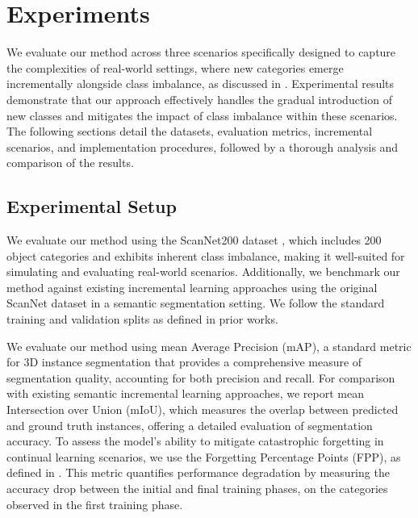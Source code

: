 
\section{Experiments}
We evaluate our method across three scenarios specifically designed to capture the complexities of real-world settings, where new categories emerge incrementally alongside class imbalance, as discussed in . Experimental results demonstrate that our approach effectively handles the gradual introduction of new classes and mitigates the impact of class imbalance within these scenarios. The following sections detail the datasets, evaluation metrics, incremental scenarios, and implementation procedures, followed by a thorough analysis and comparison of the results.

\subsection{Experimental Setup}

 We evaluate our method using the ScanNet200 dataset \cite{rozenberszki2022language}, which includes 200 object categories and exhibits inherent class imbalance, making it well-suited for simulating and evaluating real-world scenarios. Additionally, we benchmark our method against existing incremental learning approaches using the original ScanNet dataset \cite{dai2017scannet} in a semantic segmentation setting. We follow the standard training and validation splits as defined in prior works. %

We evaluate our method using mean Average Precision (mAP), a standard metric for 3D instance segmentation that provides a comprehensive measure of segmentation quality, accounting for both precision and recall.
For comparison with existing semantic incremental learning approaches, we report mean Intersection over Union (mIoU), which measures the overlap between predicted and ground truth instances, offering a detailed evaluation of segmentation accuracy.
To assess the model’s ability to mitigate catastrophic forgetting in continual learning scenarios, we use the Forgetting Percentage Points (FPP), as defined in \cite{liu2023continual}. This metric quantifies performance degradation by measuring the accuracy drop between the initial and final training phases, on the categories observed in the first training phase.

